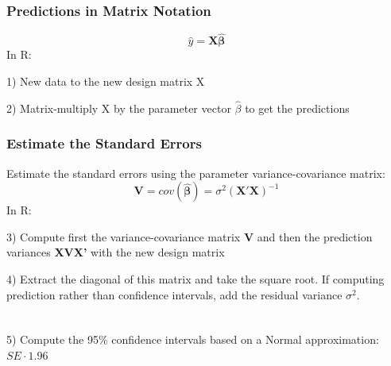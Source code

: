 \documentclass{beamer}
\begin{document}
\begin{frame}
    \frametitle{Predictions in Matrix Notation}
    \begin{equation*}
        \hat{y} = \mathbf{X \hat{\beta}}
    \end{equation*}
    In R:
    \vspace{0.5cm}
    
    1) New data to the new design matrix X
    \scalebox{0.65}{
      
    }
    \vspace{0.5cm}
    
    2) Matrix-multiply X by the parameter vector $\hat\beta$ to get the predictions
    
    \scalebox{0.65}{
      
    }
\end{frame}

\begin{frame}
    \frametitle{Estimate the Standard Errors}
    Estimate the standard errors using the parameter variance-covariance matrix:
    \begin{equation*}
        \mathbf{V} = cov(\mathbf{\hat{\beta}})=\sigma^2 (\mathbf{X}' \mathbf{X})^{-1}
    \end{equation*}
    In R:
    \vspace{0.5cm}

    3) Compute first the variance-covariance matrix \textbf{V} and then the prediction variances \textbf{XVX'} with the new design matrix

    \scalebox{0.65}{
      
    }
    \vspace{0.5cm}
    
    4) Extract the diagonal of this matrix and take the square root. If computing prediction rather than confidence intervals, add the residual variance $\sigma^2$.

    \scalebox{0.7}{
      
    }

    
\end{frame}

\begin{frame}
    \frametitle{}
    \begin{columns}
        \begin{column}{0.5\textwidth}
        5) Compute the 95\% confidence intervals based on a Normal approximation: $SE \cdot 1.96$    
        \end{column}
        \begin{column}{0.5\textwidth}
            
        \end{column}
    \end{columns}


    
    
\end{frame}
\end{document}
